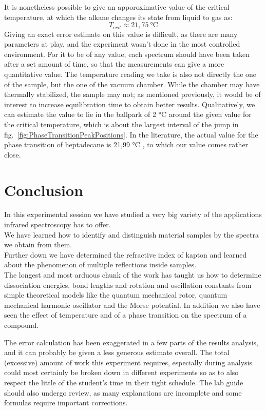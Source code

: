 \documentclass[12pt]{article}
\begin{document}
It is nonetheless possible to give an apporoximative value of the critical temperature, at which the alkane changes its state from liquid to gas as: 
\begin{equation}
    T_{crit} \approx 21,75 \ \si{\celsius}
\end{equation}
Giving an exact error estimate on this value is difficult, as there are many parameters at play, and the experiment wasn't done in the most controlled environment. For it to be of any value, each spectrum should have been taken after a set amount of time, so that the measurements can give a more quantitative value. The temperature reading we take is also not directly the one of the sample, but the one of the vacuum chamber. While the chamber may have thermally stabilized, the sample may not; as mentioned previously, it would be of interest to increase equilibration time to obtain better results. Qualitatively, we can estimate the value to lie in the ballpark of 2 \si{\celsius} around the given value for the critical temperature, which is about the largest interval of the jump in fig.~\ref{fig:PhaseTransitionPeakPositions}. In the literature, the actual value for the phase transition of heptadecane is 21,99 \si{\celsius} \cite{HeptadecaneFusionTemp}, to which our value comes rather close.

\section{Conclusion}

In this experimental session we have studied a very big variety of the applications infrared spectroscopy has to offer. \\
We have learned how to identify and distinguish material samples by the spectra we obtain from them. \\
Further down we have determined the refractive index of kapton and learned about the phenomenon of multiple reflections inside samples.\\
The longest and most arduous chunk of the work has taught us how to determine dissociation energies, bond lengths and rotation and oscillation constants from simple theoretical models like the quantum mechanical rotor, quantum mechanical harmonic oscillator and the Morse potential.
In addition we also have seen the effect of temperature and of a phase transition on the spectrum of a compound.

The error calculation has been exaggerated in a few parts of the results analysis, and it can probably be given a less generous estimate overall. The total (excessive) amount of work this experiment requires, especially during analysis could most certainly be broken down in different experiments so as to also respect the little of the student's time in their tight schedule. The lab guide should also undergo review, as many explanations are incomplete and some formulas require important corrections.   
\end{document}
